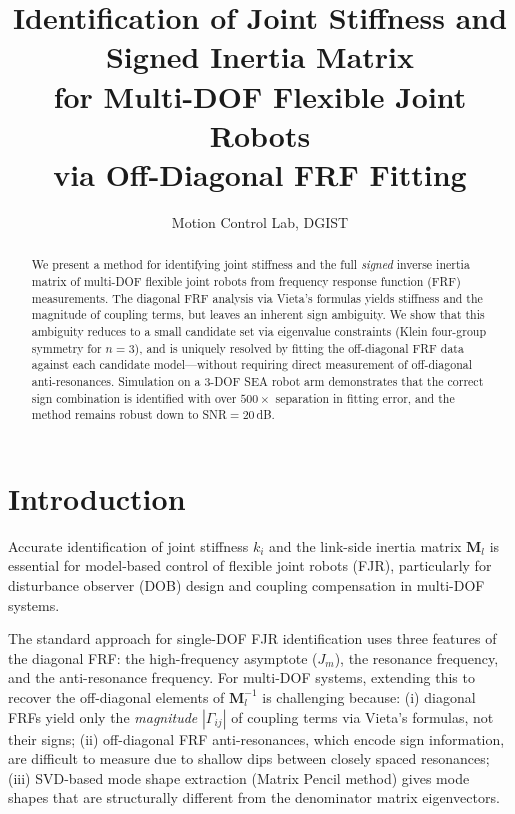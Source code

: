 \documentclass[10pt,twocolumn]{article}
\title{\textbf{Identification of Joint Stiffness and Signed Inertia Matrix\\for Multi-DOF Flexible Joint Robots\\via Off-Diagonal FRF Fitting}}
\author{Motion Control Lab, DGIST}
\date{}
\begin{document}
\maketitle

\begin{abstract}
We present a method for identifying joint stiffness and the full \emph{signed} inverse inertia matrix of multi-DOF flexible joint robots from frequency response function (FRF) measurements. The diagonal FRF analysis via Vieta's formulas yields stiffness and the magnitude of coupling terms, but leaves an inherent sign ambiguity. We show that this ambiguity reduces to a small candidate set via eigenvalue constraints (Klein four-group symmetry for $n{=}3$), and is uniquely resolved by fitting the off-diagonal FRF data against each candidate model---without requiring direct measurement of off-diagonal anti-resonances. Simulation on a 3-DOF SEA robot arm demonstrates that the correct sign combination is identified with over $500{\times}$ separation in fitting error, and the method remains robust down to SNR${=}20$\,dB.
\end{abstract}

\section{Introduction}

Accurate identification of joint stiffness $k_i$ and the link-side inertia matrix $\bm{M}_l$ is essential for model-based control of flexible joint robots (FJR), particularly for disturbance observer (DOB) design and coupling compensation in multi-DOF systems.

The standard approach for single-DOF FJR identification uses three features of the diagonal FRF: the high-frequency asymptote ($J_m$), the resonance frequency, and the anti-resonance frequency. For multi-DOF systems, extending this to recover the off-diagonal elements of $\bm{M}_l^{-1}$ is challenging because: (i) diagonal FRFs yield only the \emph{magnitude} $|\Gamma_{ij}|$ of coupling terms via Vieta's formulas, not their signs; (ii) off-diagonal FRF anti-resonances, which encode sign information, are difficult to measure due to shallow dips between closely spaced resonances; (iii) SVD-based mode shape extraction (Matrix Pencil method) gives mode shapes that are structurally different from the denominator matrix eigenvectors.
\end{document}
